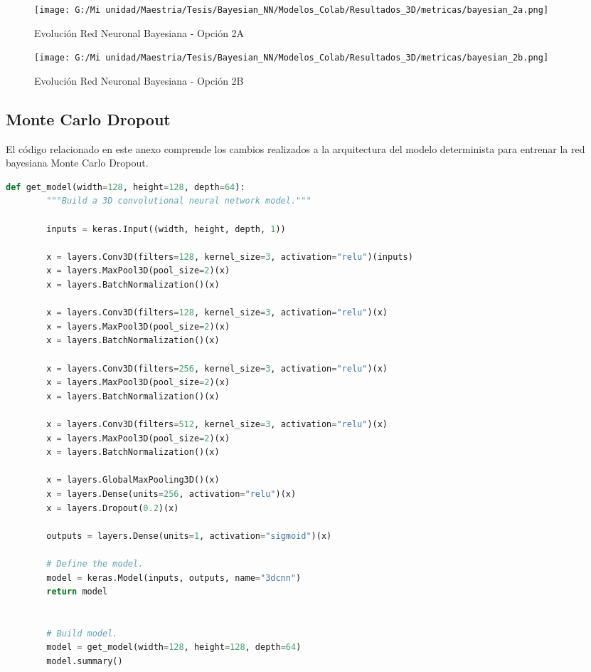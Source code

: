 \documentclass[10pt, oneside, a4paper]{article}
\begin{document}
	\begin{figure}[H]
		\centering
		\texttt{[image: G:/Mi unidad/Maestria/Tesis/Bayesian\_NN/Modelos\_Colab/Resultados\_3D/metricas/bayesian\_2a.png]}
		\caption{Evolución Red Neuronal Bayesiana - Opción 2A}
		\label{fig:bayesian_3}
	\end{figure}
	
	\begin{figure}[H]
		\centering
		\texttt{[image: G:/Mi unidad/Maestria/Tesis/Bayesian\_NN/Modelos\_Colab/Resultados\_3D/metricas/bayesian\_2b.png]}
		\caption{Evolución Red Neuronal Bayesiana - Opción 2B}
		\label{fig:bayesian_4}
	\end{figure}

	\subsection{Monte Carlo Dropout} \label{Monte_Carlo_Dropout}

	El código relacionado en este anexo comprende los cambios realizados a la arquitectura del modelo determinista para entrenar la red bayesiana Monte Carlo Dropout.
	
	\begin{adjustbox}{max width=\textwidth}
	\begin{lstlisting}[language=Python, caption={Arquitectura determinista}]
		def get_model(width=128, height=128, depth=64):
		"""Build a 3D convolutional neural network model."""
		
		inputs = keras.Input((width, height, depth, 1))
		
		x = layers.Conv3D(filters=128, kernel_size=3, activation="relu")(inputs)
		x = layers.MaxPool3D(pool_size=2)(x)
		x = layers.BatchNormalization()(x)
		
		x = layers.Conv3D(filters=128, kernel_size=3, activation="relu")(x)
		x = layers.MaxPool3D(pool_size=2)(x)
		x = layers.BatchNormalization()(x)
		
		x = layers.Conv3D(filters=256, kernel_size=3, activation="relu")(x)
		x = layers.MaxPool3D(pool_size=2)(x)
		x = layers.BatchNormalization()(x)
		
		x = layers.Conv3D(filters=512, kernel_size=3, activation="relu")(x)
		x = layers.MaxPool3D(pool_size=2)(x)
		x = layers.BatchNormalization()(x)
		
		x = layers.GlobalMaxPooling3D()(x)
		x = layers.Dense(units=256, activation="relu")(x)
		x = layers.Dropout(0.2)(x)
		
		outputs = layers.Dense(units=1, activation="sigmoid")(x)
		
		# Define the model.
		model = keras.Model(inputs, outputs, name="3dcnn")
		return model
		
		
		# Build model.
		model = get_model(width=128, height=128, depth=64)
		model.summary()
	\end{lstlisting}
	\end{adjustbox}
	
\end{document}
